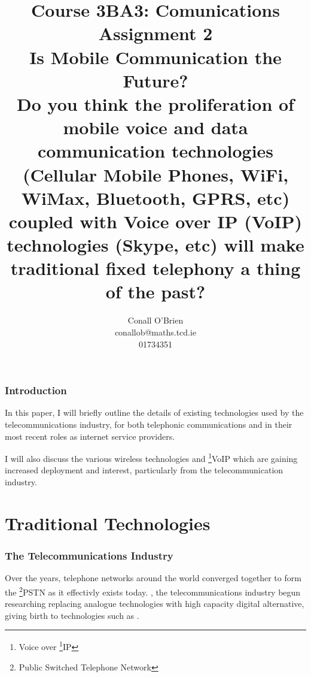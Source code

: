 \documentclass[a4paper,12pt]{article}
\begin{document}
\title{Course 3BA3: Comunications \\ \vspace{10mm} Assignment 2 \\
\vspace{10mm} Is Mobile Communication the Future? \\ \vspace{10mm}
{\small Do you think the proliferation of mobile voice and data communication
technologies (Cellular Mobile Phones, WiFi, WiMax, Bluetooth, GPRS, etc)
coupled with Voice over IP (VoIP) technologies (Skype, etc) will make
traditional fixed telephony a thing of the past?}}

\author{Conall O'Brien \\ conallob@maths.tcd.ie \\ 01734351}

\maketitle

\section{Introduction}

In this paper, I will briefly outline the details of existing
technologies used by the telecommunications industry, for both
telephonic communications and in their most recent roles as internet
service providers.


I will also discuss the various wireless technologies and
\footnote{Voice over \footnote{Internet Protocol}{IP}}{VoIP} which are
gaining increased deployment and interest, particularly from the
telecommunication industry.

\part{Traditional Technologies}

\section{The Telecommunications Industry}

Over the years, telephone networks around the world converged together
to form the \footnote{Public Switched Telephone Network}{PSTN} as it
effectivly exists today. \cite[In the 1970s]{wikipedia-pstn}, the 
telecommunications industry begun researching replacing analogue
technologies with high capacity digital alternative, giving birth to
technologies such as 
\cite[\footnote{Digital Line Subscriber}{DSL} and 
\footnote{Integrated Systems Digital Network}{ISDN}]{wikipedia-pstn}.
\end{document}

